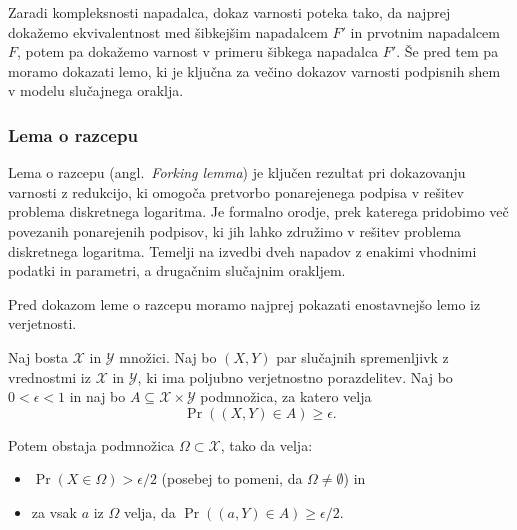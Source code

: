 Zaradi kompleksnosti napadalca, dokaz varnosti poteka tako, da najprej dokažemo ekvivalentnost med
šibkejšim napadalcem $F'$ in prvotnim napadalcem $F$, potem pa dokažemo varnost v primeru šibkega
napadalca $F'$. Še pred tem pa moramo dokazati lemo, ki je ključna za večino dokazov varnosti podpisnih
shem v modelu slučajnega oraklja.

\subsubsection{Lema o razcepu}
Lema o razcepu (angl.\ \textit{Forking lemma}) je ključen rezultat pri dokazovanju varnosti z redukcijo,
ki omogoča pretvorbo ponarejenega podpisa v rešitev problema diskretnega logaritma. Je formalno orodje,
prek katerega pridobimo več povezanih ponarejenih podpisov, ki jih lahko združimo v rešitev problema
diskretnega logaritma. Temelji na izvedbi dveh napadov z enakimi vhodnimi podatki in parametri, a
drugačnim slučajnim orakljem.

Pred dokazom leme o razcepu moramo najprej pokazati enostavnejšo lemo iz verjetnosti.

\begin{lema}
\label{lema:verjetnost}
    Naj bosta $\mathcal{X}$ in $\mathcal{Y}$ množici. Naj bo $(X, Y)$ par slučajnih spremenljivk z
    vrednostmi iz $\mathcal{X}$ in $\mathcal{Y}$, ki ima poljubno verjetnostno porazdelitev. Naj bo
    $0 < \epsilon < 1$ in naj bo $A \subseteq \mathcal{X} \times \mathcal{Y}$ podmnožica, za katero
    velja
    $$
    \Pr((X, Y) \in A) \geq \epsilon.
    $$

    Potem obstaja podmnožica $\Omega \subset \mathcal{X}$, tako da velja:
    \begin{itemize}
        \item $\Pr(X \in \Omega) > \epsilon / 2$ (posebej to pomeni, da $\Omega \neq \emptyset$) in
        \item za vsak $a$ iz $\Omega$ velja, da $\Pr((a, Y) \in A) \geq \epsilon / 2$.
    \end{itemize}
\end{lema}


